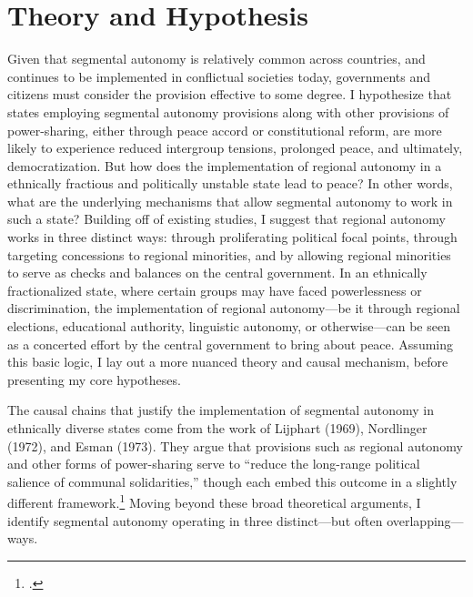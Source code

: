 \documentclass[12pt]{article}
\begin{document}
\section{Theory and Hypothesis}
Given that segmental autonomy is relatively common across countries, and continues to be implemented in conflictual societies today, governments and citizens must consider the provision effective to some degree. I hypothesize that states employing segmental autonomy provisions along with other provisions of power-sharing, either through peace accord or constitutional reform, are more likely to experience reduced intergroup tensions, prolonged peace, and ultimately, democratization. But how does the implementation of regional autonomy in a ethnically fractious and politically unstable state lead to peace? In other words, what are the underlying mechanisms that allow segmental autonomy to work in such a state? Building off of existing studies, I suggest that regional autonomy works in three distinct ways: through proliferating political focal points, through targeting concessions to regional minorities, and by allowing regional minorities to serve as checks and balances on the central government. In an ethnically fractionalized state, where certain groups may have faced powerlessness or discrimination, the implementation of regional autonomy---be it through regional elections, educational authority, linguistic autonomy, or otherwise---can be seen as a concerted effort by the central government to bring about peace. Assuming this basic logic, I lay out a more nuanced theory and causal mechanism, before presenting my core hypotheses. 

The causal chains that justify the implementation of segmental autonomy in ethnically diverse states come from the work of Lijphart (1969), Nordlinger (1972), and Esman (1973). They argue that provisions such as regional autonomy and other forms of power-sharing serve to ``reduce the long-range political salience of communal solidarities,'' though each embed this outcome in a slightly different framework.\footcite[55]{esman_management_1973} Moving beyond these broad theoretical arguments, I identify segmental autonomy operating in three distinct---but often overlapping---ways. 
\end{document}
